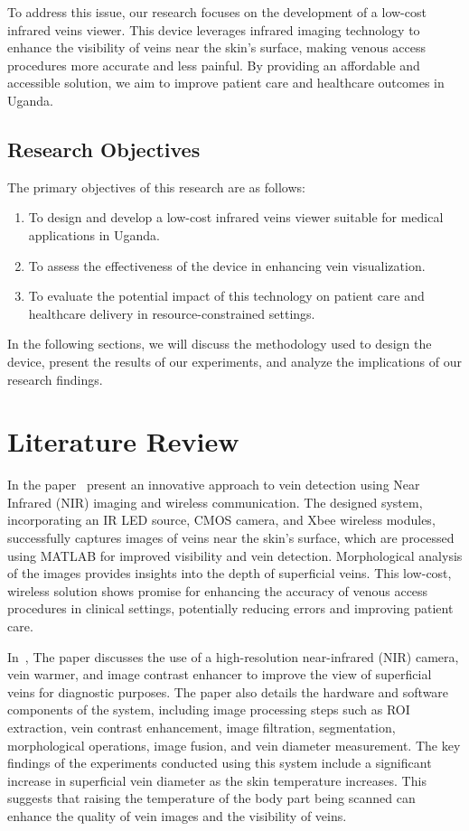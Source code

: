 \documentclass{IEEEtran}
\begin{document}
    To address this issue, our research focuses on the development of a low-cost infrared veins viewer. This device leverages infrared imaging technology to enhance the visibility of veins near the skin's surface, making venous access procedures more accurate and less painful. By providing an affordable and accessible solution, we aim to improve patient care and healthcare outcomes in Uganda.

    \subsection{Research Objectives}
    The primary objectives of this research are as follows:

    \begin{enumerate}
        \item To design and develop a low-cost infrared veins viewer suitable for medical applications in Uganda.
        \item To assess the effectiveness of the device in enhancing vein visualization.
        \item To evaluate the potential impact of this technology on patient care and healthcare delivery in resource-constrained settings.
    \end{enumerate}

    In the following sections, we will discuss the methodology used to design the device, present the results of our experiments, and analyze the implications of our research findings.


    \section{Literature Review}

    In the paper~\cite{marathe2014novel} present an innovative approach to vein detection using Near Infrared (NIR) imaging and wireless communication. The designed system, incorporating an IR LED source, CMOS camera, and Xbee wireless modules, successfully captures images of veins near the skin's surface, which are processed using MATLAB for improved visibility and vein detection. Morphological analysis of the images provides insights into the depth of superficial veins. This low-cost, wireless solution shows promise for enhancing the accuracy of venous access procedures in clinical settings, potentially reducing errors and improving patient care.

    In~\cite{ayoub2018diagnostic}, The paper discusses the use of a high-resolution near-infrared (NIR) camera, vein warmer, and image contrast enhancer to improve the view of superficial veins for diagnostic purposes. The paper also details the hardware and software components of the system, including image processing steps such as ROI extraction, vein contrast enhancement, image filtration, segmentation, morphological operations, image fusion, and vein diameter measurement.
    The key findings of the experiments conducted using this system include a significant increase in superficial vein diameter as the skin temperature increases. This suggests that raising the temperature of the body part being scanned can enhance the quality of vein images and the visibility of veins.
\end{document}
